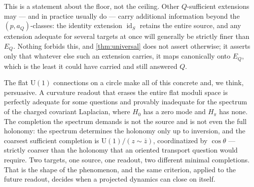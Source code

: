 \documentclass[11pt,reqno]{amsart}
\theoremstyle{plain}
\theoremstyle{definition}
\newcommand{\Uone}{\mathrm{U}(1)}
\newcommand{\Src}{S}
\newcommand{\id}{\operatorname{id}}
\begin{document}
This is a statement about the floor, not the ceiling. Other $Q$-sufficient extensions may --- and
in practice usually do --- carry additional information beyond the $(p,a_Q)$-classes: the identity
extension $\id_\Src$ retains the entire source, and any extension adequate for several targets at
once will generally be strictly finer than $E_Q$. Nothing forbids this, and \cref{thm:universal}
does not assert otherwise; it asserts only that whatever else such an extension carries, it maps
canonically onto $E_Q$, which is the least it could have carried and still answered $Q$.

The flat $\Uone$ connections on a circle make all of this concrete and, we think, persuasive. A
curvature readout that erases the entire flat moduli space is perfectly adequate for some
questions and provably inadequate for the spectrum of the charged covariant Laplacian, where
$H_0$ has a zero mode and $H_\pi$ has none. The completion the spectrum demands is not the source
and is not even the full holonomy: the spectrum determines the holonomy only up to inversion, and
the coarsest sufficient completion is $\Uone/(z\sim\bar z)$, coordinatized by $\cos\theta$ ---
strictly coarser than the holonomy that an oriented transport question would require. Two targets,
one source, one readout, two different minimal completions. That is the shape of the phenomenon,
and the same criterion, applied to the future readout, decides when a projected dynamics can close
on itself.
\end{document}
